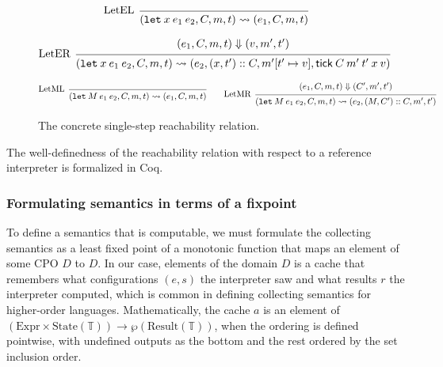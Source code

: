 \documentclass[acmsmall,review]{acmart}\settopmatter{printfolios=true,printccs=false,printacmref=false}
\theoremstyle{definition}
\newcommand*{\cons}{::}
\newcommand*{\Expr}{\text{Expr}}
\newcommand*{\Time}{\mathbb{T}}
\newcommand*{\mem}{m}
\newcommand*{\State}[1]{\text{State}({#1})}
\newcommand*{\Result}[1]{\text{Result}({#1})}
\newcommand*{\tick}{\mathsf{tick}}
\begin{document}
\begin{figure}[htb]
  \[
    \begin{prooftree}
      \infer[left label=LetEL]0{
      (\mathtt{let}\:x\:e_1\:e_2, C, \mem, t)
      \rightsquigarrow
      (e_{1}, C, \mem, t)
      }
    \end{prooftree}
  \]

  \[
    \begin{prooftree}
      \hypo{
        \begin{matrix}
          (e_{1}, C, \mem, t)
          \Downarrow
          (v, \mem', t')
        \end{matrix}
      }
      \infer[left label=LetER]1{
      (\mathtt{let}\:x\:e_1\:e_2, C, \mem, t)
      \rightsquigarrow
      (e_{2}, (x, t')\cons C, \mem'[t'\mapsto v], \tick\:C\:\mem'\:t'\:x\:v)
      }
    \end{prooftree}
  \]

  \[
    \begin{prooftree}
      \infer[left label=LetML]0{
      (\mathtt{let}\:M\:e_{1}\:e_{2}, C, \mem, t)
      \rightsquigarrow
      (e_{1}, C, \mem, t)
      }
    \end{prooftree}\qquad
    \begin{prooftree}
      \hypo{
        \begin{matrix}
          (e_{1}, C, \mem, t)
          \Downarrow
          (C', \mem', t')
        \end{matrix}
      }
      \infer[left label=LetMR]1{
      (\mathtt{let}\:M\:e_{1}\:e_{2}, C, \mem, t)
      \rightsquigarrow
      (e_{2}, (M, C')\cons C, \mem', t')
      }
    \end{prooftree}
  \]
  \caption{The concrete single-step reachability relation.}
  \label{fig:concreach}
\end{figure}
The well-definedness of the reachability relation with respect to a reference interpreter is formalized in Coq.

\subsubsection{Formulating semantics in terms of a fixpoint}

To define a semantics that is computable, we must formulate the collecting semantics as a least fixed point of a monotonic function that maps an element of some CPO $D$ to $D$.
In our case, elements of the domain $D$ is a cache that remembers what configurations $(e,s)$ the interpreter saw and what results $r$ the interpreter computed, which is common in defining collecting semantics for higher-order languages\cite{HudakYoung,DBLP:journals/pacmpl/DaraisLNH17}.
Mathematically, the cache $a$ is an element of $(\Expr\times\State{\Time})\rightarrow\wp(\Result{\Time})$, when the ordering is defined pointwise, with undefined outputs as the bottom and the rest ordered by the set inclusion order.
\end{document}
